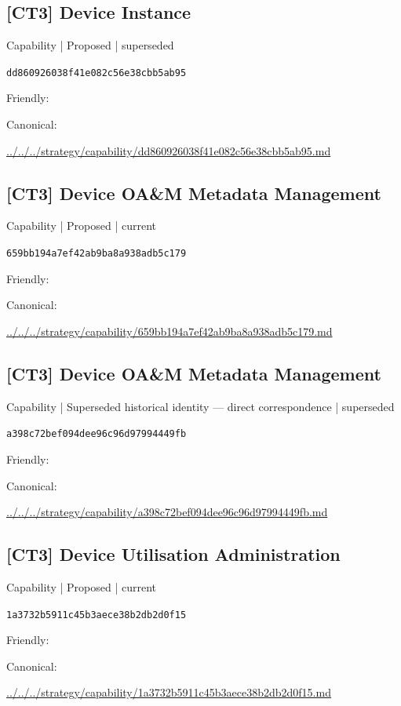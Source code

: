 \documentclass[10pt,a4paper]{article}
\begin{document}
\subsection*{[CT3] Device Instance}
{\small Capability | Proposed | superseded}\par
\texttt{dd860926038f41e082c56e38cbb5ab95}\par
Friendly: \par
Canonical: \par
{\footnotesize\url{../../../strategy/capability/dd860926038f41e082c56e38cbb5ab95.md}}\par
\subsection*{[CT3] Device OA\&M Metadata Management}
{\small Capability | Proposed | current}\par
\texttt{659bb194a7ef42ab9ba8a938adb5c179}\par
Friendly: \par
Canonical: \par
{\footnotesize\url{../../../strategy/capability/659bb194a7ef42ab9ba8a938adb5c179.md}}\par
\subsection*{[CT3] Device OA\&M Metadata Management}
{\small Capability | Superseded historical identity — direct correspondence | superseded}\par
\texttt{a398c72bef094dee96c96d97994449fb}\par
Friendly: \par
Canonical: \par
{\footnotesize\url{../../../strategy/capability/a398c72bef094dee96c96d97994449fb.md}}\par
\subsection*{[CT3] Device Utilisation Administration}
{\small Capability | Proposed | current}\par
\texttt{1a3732b5911c45b3aece38b2db2d0f15}\par
Friendly: \par
Canonical: \par
{\footnotesize\url{../../../strategy/capability/1a3732b5911c45b3aece38b2db2d0f15.md}}\par
\end{document}
